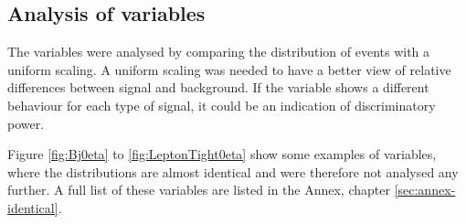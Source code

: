 \documentclass[11pt]{scrartcl}
\begin{document}
	\subsection{Analysis of variables}
	
The variables were analysed by comparing the distribution of events with a uniform scaling. A uniform scaling was needed to have a better view of relative differences between signal and background. If the variable shows a different behaviour for each type of signal, it could be an indication of discriminatory power. 

Figure \ref{fig:Bj0eta} to \ref{fig:LeptonTight0eta} show some examples of variables, where the distributions are almost identical and were therefore not analysed any further. A full list of these variables are listed in the Annex, chapter \ref{sec:annex-identical}. 
\end{document}
